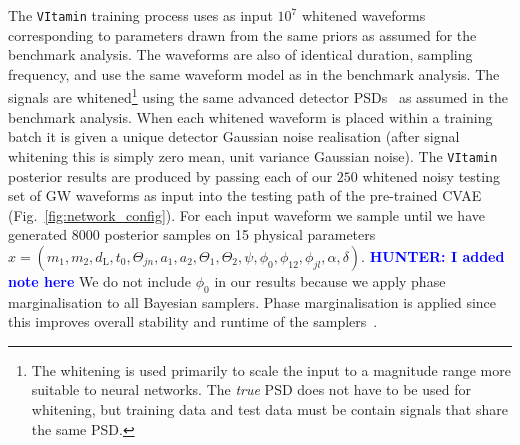 \documentclass[%
showpacs,
nofootinbib,
 amsmath,amssymb,
 aps,
 twocolumn,
 prl,
 reprint,
floatfix,
]{revtex4-1}
\newcommand{\hunter}[1]{\textbf{\textcolor{blue}{HUNTER: #1}}}
\begin{document}
%
%
The \texttt{VItamin} training process uses as input $10^{7}$ whitened
waveforms corresponding to parameters drawn from the same priors as assumed for
the benchmark analysis. The waveforms are also of identical duration, sampling
frequency, and use the same waveform model as in the benchmark analysis.
The signals are whitened\footnote{The whitening is used primarily to
scale the input to a magnitude range more suitable to neural networks. The
\emph{true} \ac{PSD} does not have to be used for whitening, but training data
and test data must be contain signals that share the same \ac{PSD}.}
using the same advanced detector \acp{PSD}~\cite{aligo_noisecurves} as
assumed in the benchmark analysis. When each whitened waveform is placed
within a training batch it is given a unique detector Gaussian noise
realisation (after signal whitening this is simply zero mean, unit
variance Gaussian noise). The \texttt{VItamin} posterior results are produced by
passing each of our $250$ whitened noisy testing set of \ac{GW} waveforms
as input into the testing path of the pre-trained
\ac{CVAE} (Fig.~\ref{fig:network_config}). For each input waveform we sample until we
have generated $8000$ posterior samples on 15 physical parameters
$x=(m_1,m_2,d_{\text{L}},t_{0},\Theta_{jn},a_1,a_2,\Theta_1,\Theta_2,\psi, \phi_0,
\phi_{12},\phi_{jl},\alpha,\delta)$.  \hunter{I added note here}
We do not include $\phi_0$ in our results 
because we apply phase marginalisation to all Bayesian samplers. Phase marginalisation is 
applied since this 
improves overall stability and runtime of the samplers~\cite{1811.02042}.
\end{document}
